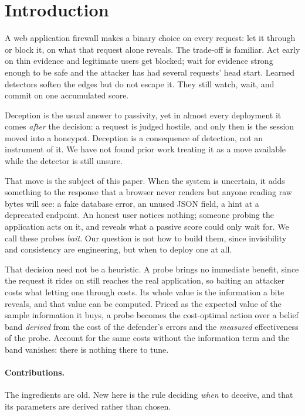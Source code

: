 \documentclass[runningheads]{llncs}
\begin{document}
\section{Introduction}

A web application firewall makes a binary choice on every request: let it through or
block it, on what that request alone reveals. The trade-off is familiar. Act early
on thin evidence and legitimate users get blocked; wait for evidence strong enough
to be safe and the attacker has had several requests' head start. Learned detectors
soften the edges but do not escape it. They still watch, wait, and commit on one
accumulated score.

Deception is the usual answer to passivity, yet in almost every deployment it comes
\emph{after} the decision: a request is judged hostile, and only then is the
session moved into a honeypot. Deception is a consequence of detection, not an
instrument of it. We have not found prior work treating it as a move available
while the detector is still unsure.

That move is the subject of this paper. When the system is uncertain, it adds
something to the response that a browser never renders but anyone reading raw
bytes will see: a fake database error, an unused JSON field, a hint at a
deprecated endpoint. An honest user notices nothing; someone probing the
application acts on it, and reveals what a passive score could only wait for. We
call these probes \emph{bait}. Our question is not how to build them, since
invisibility and consistency are engineering, but when to deploy one at all.

That decision need not be a heuristic. A probe brings no immediate benefit, since
the request it rides on still reaches the real application, so baiting an attacker
costs what letting one through costs. Its whole value is the information a bite
reveals, and that value can be computed. Priced as the expected value of the sample
information it buys, a probe becomes the cost-optimal action over a belief band
\emph{derived} from the cost of the defender's errors and the \emph{measured}
effectiveness of the probe. Account for the same costs without the information term
and the band vanishes: there is nothing there to tune.

\paragraph{Contributions.}
The ingredients are old. New here is the rule deciding \emph{when} to deceive, and
that its parameters are derived rather than chosen.
\end{document}
